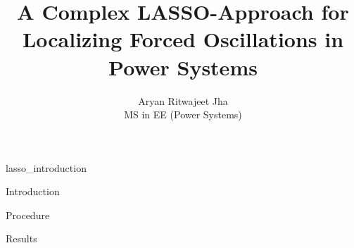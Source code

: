 \documentclass[10pt]{beamer}
\title{A Complex LASSO-Approach for Localizing Forced Oscillations in Power Systems}
\date{}
\author{Aryan Ritwajeet Jha \\MS in EE (Power Systems)}
\institute{Department of Electrical Engineering\\ IIT Delhi}
\begin{document}
\maketitle

{lasso_introduction}

{Introduction}


{Procedure}

{Results}


\end{document}
